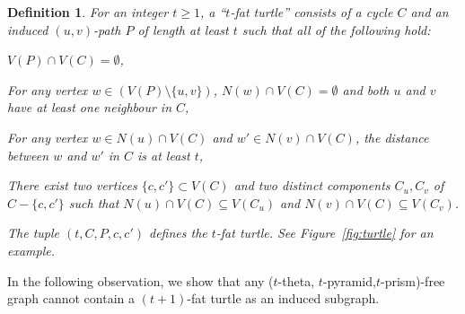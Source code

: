 \documentclass[a4paper]{article}
\newtheorem{definition}[theorem]{Definition}
\begin{document}
\begin{definition}
For an integer $t\geq 1$, a ``$t$-fat turtle'' consists of a cycle $C$ and an induced $(u,v)$-path $P$ of length at least $t$ 
such that all of the following hold: 
\begin{enumerate*}[label=(\alph*)]

\item $V(P) \cap V(C) = \emptyset$,

\item For any vertex $w\in (V(P)\setminus \{u,v\})$, $N(w) \cap V(C) = \emptyset$ and both $u$ and $v$ have at least one neighbour in $C$,

\item For any vertex $w\in N(u) \cap V(C)$ and $w'\in N(v)\cap V(C)$, the distance between $w$ and $w'$ in $C$ is at least $t$,

\item There exist two vertices $\{c,c'\}\subset V(C)$ and two distinct components $C_u,C_v$ of $C-\{c,c'\}$ such that $N(u) \cap V(C) \subseteq V(C_u)$ and $N(v) \cap V(C) \subseteq V(C_v)$.

\end{enumerate*}

The tuple $(t,C,P,c,c')$ defines the $t$-fat turtle. See Figure~\ref{fig:turtle} for an example.
\end{definition}

In the following observation, we show that any ($t$-theta, $t$-pyramid,$t$-prism)-free graph cannot contain a $(t+1)$-fat turtle as an induced subgraph.
\end{document}
